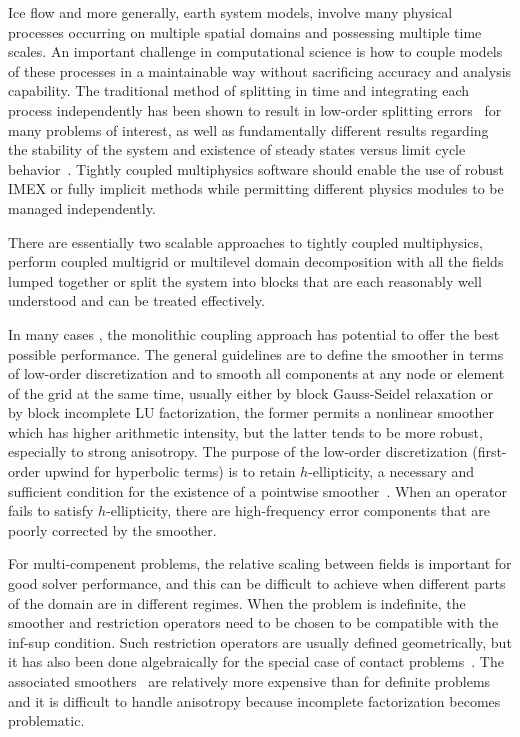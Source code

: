 Ice flow and more generally, earth system models, involve many physical processes occurring on multiple spatial domains and possessing multiple time scales.
An important challenge in computational science is how to couple models of these processes in a maintainable way without sacrificing accuracy and analysis capability.
The traditional method of splitting in time and integrating each process independently has been shown to result in low-order splitting errors~\cite{knoll2003bat,mousseau2002inc} for many problems of interest, as well as fundamentally different results regarding the stability of the system \cite{estep2008posteriori} and existence of steady states versus limit cycle behavior~\cite{jardin20081d}.
Tightly coupled multiphysics software should enable the use of robust IMEX or fully implicit methods while permitting different physics modules to be managed independently.

There are essentially two scalable approaches to tightly coupled multiphysics, perform coupled multigrid or multilevel domain decomposition with all the fields lumped together or split the system into blocks that are each reasonably well understood and can be treated effectively.

In many cases \cite{rannacher2000finite,jameson2001many,adams2010toward}, the monolithic coupling approach has potential to offer the best possible performance.
The general guidelines are to define the smoother in terms of low-order discretization and to smooth all components at any node or element of the grid at the same time, usually either by block Gauss-Seidel relaxation or by block incomplete LU factorization, the former permits a nonlinear smoother which has higher arithmetic intensity, but the latter tends to be more robust, especially to strong anisotropy.
The purpose of the low-order discretization (first-order upwind for hyperbolic terms) is to retain $h$-ellipticity, a necessary and sufficient condition for the existence of a pointwise smoother~\cite{brandt1979multigrid,trottenberg2001multigrid}.
When an operator fails to satisfy $h$-ellipticity, there are high-frequency error components that are poorly corrected by the smoother.

For multi-compenent problems, the relative scaling between fields is important for good solver performance, and this can be difficult to achieve when different parts of the domain are in different regimes.
When the problem is indefinite, the smoother and restriction operators need to be chosen to be compatible with the inf-sup condition.
Such restriction operators are usually defined geometrically, but it has also been done algebraically for the special case of contact problems~\cite{adams2004amm}.
The associated smoothers~\cite{vanka1986block} are relatively more expensive than for definite problems and it is difficult to handle anisotropy because incomplete factorization becomes problematic.

